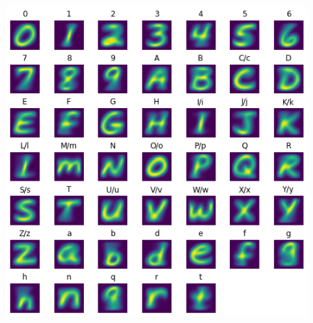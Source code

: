 \documentclass[12pt, spanish]{article}
\begin{document}
\begin{figure}[hbt!]
\centering
\includegraphics[width = 1\linewidth]{images/samples_by_mean.png}
\label{fig:samples_by_mean}
\end{figure}

\end{document}
